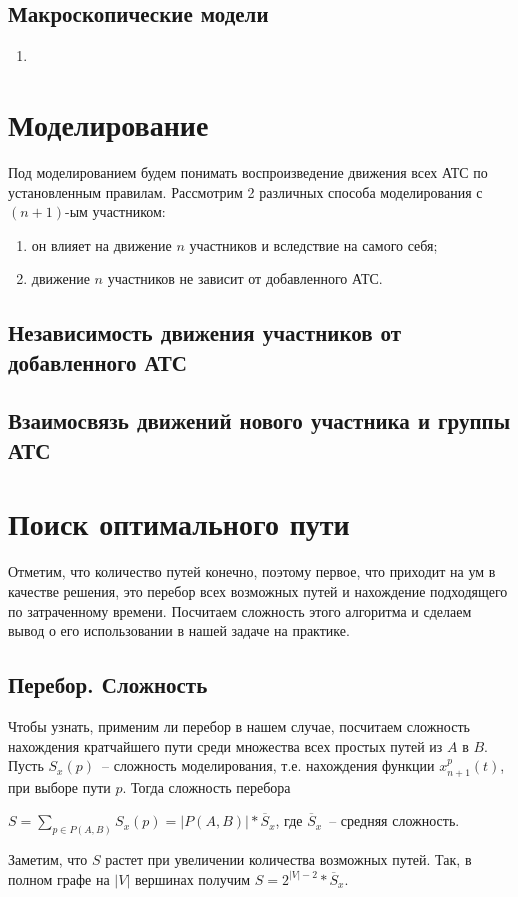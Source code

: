 \documentclass[12pt, a4paper]{article}
\begin{document}
\subsection{Макроскопические модели}
\begin{enumerate}
	\item 
	
\end{enumerate}

\newpage
\section{Моделирование}

Под моделированием будем понимать воспроизведение движения всех АТС по установленным правилам. Рассмотрим 2 различных способа моделирования с $(n+1)$-ым участником: 
\begin{enumerate}
	\item он влияет на движение $n$ участников и вследствие на самого себя;
	\item движение $n$ участников не зависит от добавленного АТС.
\end{enumerate}

\subsection{Независимость движения участников от добавленного АТС}
\subsection{Взаимосвязь движений нового участника и группы АТС}

\newpage
\section{Поиск оптимального пути}

Отметим, что количество путей конечно, поэтому первое, что приходит на ум в качестве решения, это перебор всех возможных путей и нахождение подходящего по затраченному времени. Посчитаем сложность этого алгоритма и сделаем вывод о его использовании в нашей задаче на практике.

\subsection{Перебор. Сложность}
Чтобы узнать, применим ли перебор в нашем случае, посчитаем сложность нахождения кратчайшего пути среди множества всех простых путей из $A$ в $B$. Пусть $S_x(p)$~-- сложность моделирования, т.е. нахождения функции $x^p_{n+1}(t)$, при выборе пути $p$. Тогда сложность перебора
\begin{center}
 $S = \sum\limits_{p \in P(A,B)} S_x(p) = \vert P(A,B) \vert * \overline S_x$, где $\overline S_x$~-- средняя сложность.
\end{center}
Заметим, что $ S $ растет при увеличении количества возможных путей. Так, в полном графе на $\vert V \vert$ вершинах получим $S = 2^{|V|-2} * \overline S_x$.
\end{document}
